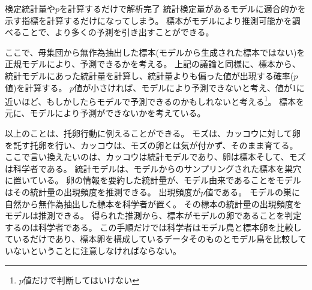 \begin{SMbox}{検定統計量や$p$を計算するだけで解析完了}
 統計検定量があるモデルに適合的かを示す指標を計算するだけになってしまう。
 標本がモデルにより推測可能かを調べることで、より多くの予測を引き出すことができる。
\end{SMbox}


ここで、母集団から無作為抽出した標本(モデルから生成された標本ではない)を正規モデルにより、予測できるかを考える。
上記の議論と同様に、標本から、統計モデルにあった統計量を計算し、統計量よりも偏った値が出現する確率($p$値)を計算する。
$p$値が小さければ、モデルにより予測できないと考え、値が1に近いほど、もしかしたらモデルで予測できるのかもしれないと考える\footnote{$p$値だけで判断してはいけない}。
標本を元に、モデルにより予測ができないかを考えている。



以上のことは、托卵行動に例えることができる。
モズは、カッコウに対して卵を託す托卵を行い、カッコウは、モズの卵とは気が付かず、そのまま育てる。
ここで言い換えたいのは、カッコウは統計モデルであり、卵は標本そして、モズは科学者である。
統計モデルは、モデルからのサンプリングされた標本を巣穴に置いている。
卵の情報を要約した統計量が、モデル由来であることをモデルはその統計量の出現頻度を推測できる。
出現頻度が$p$値である。
モデルの巣に自然から無作為抽出した標本を科学者が置く。
その標本の統計量の出現頻度をモデルは推測できる。
得られた推測から、標本がモデルの卵であることを判定するのは科学者である。
この手順だけでは科学者はモデル鳥と標本卵を比較しているだけであり、標本卵を構成しているデータそのものとモデル鳥を比較していないということに注意しなければならない。


